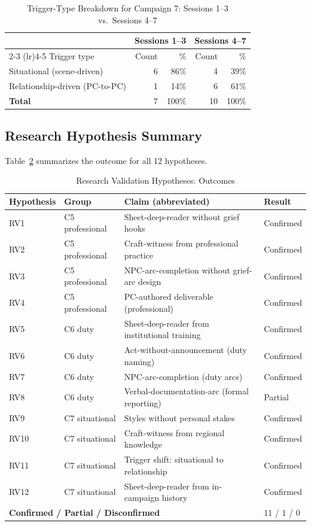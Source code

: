 \begin{table}[t]
\centering
\caption{Trigger-Type Breakdown for Campaign 7: Sessions 1--3 vs.\ Sessions 4--7}
\label{tab:trigger-shift}
\begin{tabular}{@{}lrrrr@{}}
\toprule
 & \multicolumn{2}{c}{Sessions 1--3} & \multicolumn{2}{c}{Sessions 4--7} \\
\cmidrule(lr){2-3} \cmidrule(lr){4-5}
Trigger type & Count & \% & Count & \% \\
\midrule
Situational (scene-driven)      & 6 & 86\% &  4 & 39\% \\
Relationship-driven (PC-to-PC)  & 1 & 14\% &  6 & 61\% \\
\midrule
\textbf{Total}                  & 7 & 100\% & 10 & 100\% \\
\bottomrule
\end{tabular}
\end{table}

\subsection{Research Hypothesis Summary}

Table~\ref{tab:rv-summary} summarizes the outcome for all 12 hypotheses.

\begin{table}[t]
\centering
\caption{Research Validation Hypotheses: Outcomes}
\label{tab:rv-summary}
\begin{tabular}{@{}llp{4cm}l@{}}
\toprule
Hypothesis & Group & Claim (abbreviated) & Result \\
\midrule
RV1  & C5 professional & Sheet-deep-reader without grief hooks & Confirmed \\
RV2  & C5 professional & Craft-witness from professional practice & Confirmed \\
RV3  & C5 professional & NPC-arc-completion without grief-arc design & Confirmed \\
RV4  & C5 professional & PC-authored deliverable (professional) & Confirmed \\
RV5  & C6 duty         & Sheet-deep-reader from institutional training & Confirmed \\
RV6  & C6 duty         & Act-without-announcement (duty naming) & Confirmed \\
RV7  & C6 duty         & NPC-arc-completion (duty arcs) & Confirmed \\
RV8  & C6 duty         & Verbal-documentation-arc (formal reporting) & Partial \\
RV9  & C7 situational  & Styles without personal stakes & Confirmed \\
RV10 & C7 situational  & Craft-witness from regional knowledge & Confirmed \\
RV11 & C7 situational  & Trigger shift: situational to relationship & Confirmed \\
RV12 & C7 situational  & Sheet-deep-reader from in-campaign history & Confirmed \\
\midrule
\multicolumn{3}{l}{\textbf{Confirmed / Partial / Disconfirmed}} & 11 / 1 / 0 \\
\bottomrule
\end{tabular}
\end{table}

